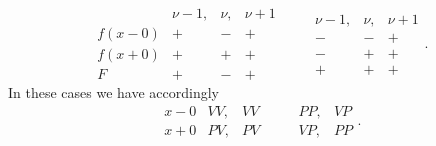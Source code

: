 \[
\begin{array}{|c|ccc|}
 & \nu-1, & \nu, & \nu+1 \\ \hline
f(x-0) & + & - & + \\
f(x+0) & + & + & + \\ \hline
F & + & - & +
\end{array}
\qquad
\begin{array}{|ccc|}
\nu-1, & \nu, & \nu+1 \\ \hline
- & - & + \\
- & + & + \\ \hline
+ & + & +
\end{array}.
\]
In these cases we have accordingly
\[
\begin{array}{|c|cc|}
x-0 & VV, & VV \\
x+0 & PV, & PV
\end{array}
\qquad
\begin{array}{|cc|}
PP, & VP \\
VP, & PP
\end{array}.
\]
